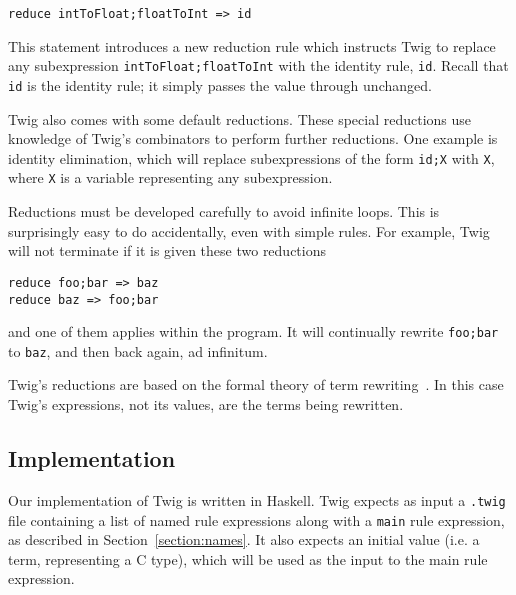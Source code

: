 \begin{verbatim}
reduce intToFloat;floatToInt => id
\end{verbatim}

This statement introduces a new reduction rule which instructs Twig to replace
any subexpression \texttt{intToFloat;floatToInt} with the identity rule,
\texttt{id}. Recall that \texttt{id} is the identity rule; it simply passes
the value through unchanged.

Twig also comes with some default reductions. These special reductions use
knowledge of Twig's combinators to perform further reductions. One example is
identity elimination, which will replace subexpressions of the form
\texttt{id;X} with \texttt{X}, where \texttt{X} is a variable representing any
subexpression.

Reductions must be developed carefully to avoid infinite loops. This is
surprisingly easy to do accidentally, even with simple rules. For example,
Twig will not terminate if it is given these two reductions

\begin{verbatim}
reduce foo;bar => baz
reduce baz => foo;bar
\end{verbatim}

and one of them applies within the program. It will continually rewrite
\texttt{foo;bar} to \texttt{baz}, and then back again, ad infinitum.

Twig's reductions are based on the formal theory of term
rewriting~\cite{baader98rewriting}. In this case Twig's expressions, not its
values, are the terms being rewritten.




\subsection{Implementation}

Our implementation of Twig is written in Haskell. Twig expects as input a
\texttt{.twig} file containing a list of named rule expressions along with a
\texttt{main} rule expression, as described in Section~\ref{section:names}. It
also expects an initial value (i.e. a term, representing a C type), which will
be used as the input to the main rule expression.

